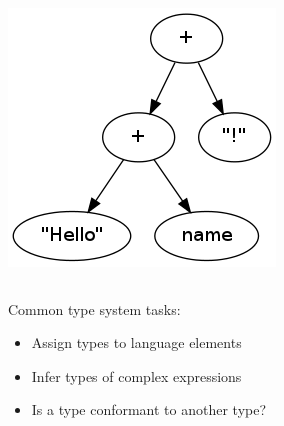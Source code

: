 \begin{frame}[fragile]
  \frametitle{\typIntro}
  \begin{columns}[T]
        
        \includegraphics[scale=0.45]{img/ast1.png}
  \end{columns}
  \pause
  Common type system tasks:

  \begin{itemize}
    \item Assign types to language elements
    \item Infer types of complex expressions
    \item Is a type conformant to another type?
  \end{itemize}
\end{frame}